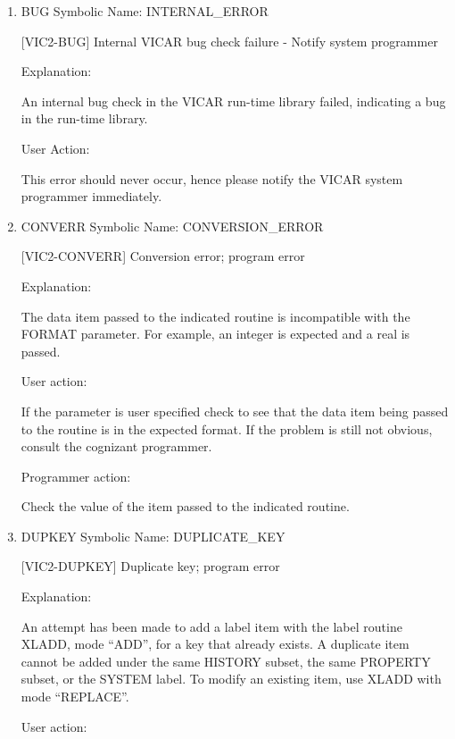 \begin{enumerate}
 BLTYPE name too long; program error

Explanation:

The binary label type name given on the BLTYPE optional has exceeded the
maximum string size allowed (11 characters).

User action:

Consult the cognizant programmer.


\item BUG Symbolic Name: INTERNAL\_ERROR

[VIC2-BUG] Internal VICAR bug check failure - Notify system programmer

Explanation:

An internal bug check in the VICAR run-time library failed,
indicating a bug in the run-time library.

User Action:

This error should never occur, hence please notify the
VICAR system programmer immediately.


\item CONVERR Symbolic Name: CONVERSION\_ERROR

[VIC2-CONVERR] Conversion error; program error

Explanation:

The data item passed to the indicated routine is incompatible
with the FORMAT parameter.  For example, an integer is expected
and a real is passed.

User action:

If the parameter is user specified check to see that the data
item being passed to the routine is in the expected format.
If the problem is still not obvious, consult the cognizant programmer.

Programmer action:

Check the value of the item passed to the indicated routine.


\item DUPKEY Symbolic Name: DUPLICATE\_KEY

[VIC2-DUPKEY] Duplicate key; program error

Explanation:

An attempt has been made to add a label item with the label routine
XLADD, mode ``ADD'', for a key that already exists.  A duplicate
item cannot be added under the same HISTORY subset, the same PROPERTY
subset, or the SYSTEM label.  To modify an existing item, use XLADD
with mode ``REPLACE''.

User action:


\end{enumerate}
